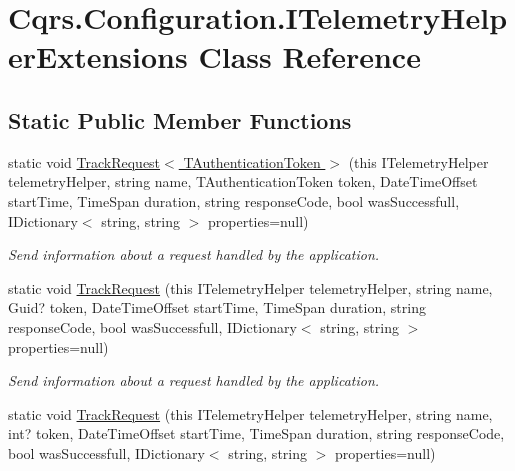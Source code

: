 \hypertarget{classCqrs_1_1Configuration_1_1ITelemetryHelperExtensions}{}\section{Cqrs.\+Configuration.\+I\+Telemetry\+Helper\+Extensions Class Reference}
\label{classCqrs_1_1Configuration_1_1ITelemetryHelperExtensions}
\subsection*{Static Public Member Functions}
\begin{DoxyCompactItemize}
\item 
static void \hyperlink{classCqrs_1_1Configuration_1_1ITelemetryHelperExtensions_a2e4bf3f56dbd0d10acac587499aca7ba_a2e4bf3f56dbd0d10acac587499aca7ba}{Track\+Request$<$ T\+Authentication\+Token $>$} (this I\+Telemetry\+Helper telemetry\+Helper, string name, T\+Authentication\+Token token, Date\+Time\+Offset start\+Time, Time\+Span duration, string response\+Code, bool was\+Successfull, I\+Dictionary$<$ string, string $>$ properties=null)
\begin{DoxyCompactList}\small\item\em Send information about a request handled by the application. \end{DoxyCompactList}\item 
static void \hyperlink{classCqrs_1_1Configuration_1_1ITelemetryHelperExtensions_a8e248c0990f9abd8f9d7f06a6e82c1d6_a8e248c0990f9abd8f9d7f06a6e82c1d6}{Track\+Request} (this I\+Telemetry\+Helper telemetry\+Helper, string name, Guid? token, Date\+Time\+Offset start\+Time, Time\+Span duration, string response\+Code, bool was\+Successfull, I\+Dictionary$<$ string, string $>$ properties=null)
\begin{DoxyCompactList}\small\item\em Send information about a request handled by the application. \end{DoxyCompactList}\item 
static void \hyperlink{classCqrs_1_1Configuration_1_1ITelemetryHelperExtensions_a4a954213d1a2e3782de2bd4ebe1ec2e9_a4a954213d1a2e3782de2bd4ebe1ec2e9}{Track\+Request} (this I\+Telemetry\+Helper telemetry\+Helper, string name, int? token, Date\+Time\+Offset start\+Time, Time\+Span duration, string response\+Code, bool was\+Successfull, I\+Dictionary$<$ string, string $>$ properties=null)

\end{DoxyCompactItemize}
